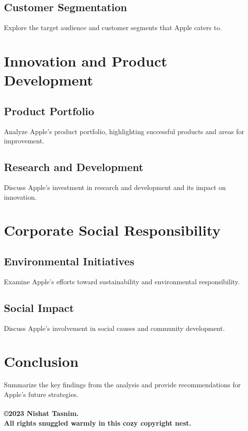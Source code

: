 \documentclass{article}
\begin{document}
\subsection{Customer Segmentation}
Explore the target audience and customer segments that Apple caters to.

\section{Innovation and Product Development}

\subsection{Product Portfolio}
Analyze Apple's product portfolio, highlighting successful products and areas for improvement.

\subsection{Research and Development}
Discuss Apple's investment in research and development and its impact on innovation.

\section{Corporate Social Responsibility}

\subsection{Environmental Initiatives}
Examine Apple's efforts toward sustainability and environmental responsibility.

\subsection{Social Impact}
Discuss Apple's involvement in social causes and community development.

\section{Conclusion}
Summarize the key findings from the analysis and provide recommendations for Apple's future strategies. \\\\ \textbf{\copyright 2023 Nishat Tasnim.}\\
\textbf{\textregistered All rights snuggled warmly in this cozy copyright nest.}
\end{document}
